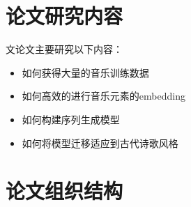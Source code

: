 \section{论文研究内容}

文论文主要研究以下内容：

\begin{itemize}

	\item{如何获得大量的音乐训练数据}
	\item{如何高效的进行音乐元素的embedding}
	\item{如何构建序列生成模型}
	\item{如何将模型迁移适应到古代诗歌风格}

\end{itemize}


\section{论文组织结构}


